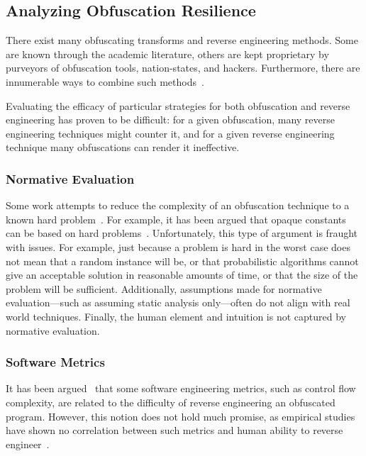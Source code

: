 
\subsection{Analyzing Obfuscation Resilience} \label{curanalysis}
There exist many obfuscating transforms and reverse engineering methods. Some are known through the academic literature, others are kept proprietary by purveyors of obfuscation tools, nation-states, and hackers. Furthermore, there are innumerable ways to combine such methods~\cite{heffner04obfuscation}.  

Evaluating the efficacy of particular strategies for both obfuscation and reverse engineering has proven to be difficult: for a given obfuscation, many reverse engineering techniques might counter it, and for a given reverse engineering technique many obfuscations can render it ineffective.

\subsubsection{Normative Evaluation}
Some work attempts to reduce the complexity of an obfuscation technique to a known hard problem~\cite{collberg1997taxonomy}. For example, it has been argued that opaque constants can be based on hard problems~\cite{tiella2017automatic}. Unfortunately, this type of argument is fraught with issues. For example, just because a problem is hard in the worst case does not mean that a random instance will be, or that probabilistic algorithms cannot give an acceptable solution in reasonable amounts of time, or that the size of the problem will be sufficient. Additionally, assumptions made for normative evaluation---such as assuming static analysis only---often do not align with real world techniques. Finally, the human element and intuition is not captured by normative evaluation.

\subsubsection{Software Metrics}
It has been argued~\cite{collberg1997taxonomy} that some software engineering metrics, such as control flow complexity, are related to the difficulty of reverse engineering an obfuscated program. However, this notion does not hold much promise, as empirical studies have shown no correlation between such metrics and human ability to reverse engineer~\cite{sutherland2006empirical}.

